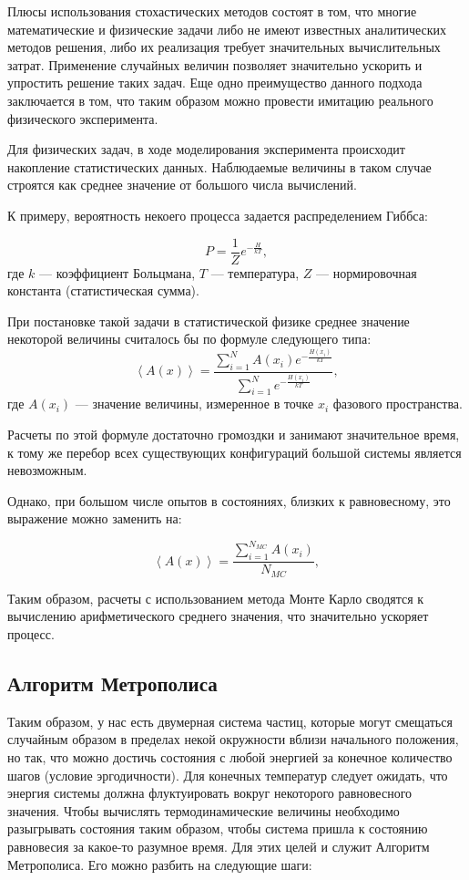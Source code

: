 \documentclass[14pt,a4paper,report]{ncc}
\begin{document}
Плюсы использования стохастических методов состоят в том, что многие математические и физические задачи либо не имеют известных аналитических методов решения, либо их реализация требует значительных вычислительных затрат. Применение случайных величин позволяет значительно ускорить и упростить решение таких задач. Еще одно преимущество данного подхода заключается в том, что таким образом можно провести имитацию реального физического эксперимента.

Для физических задач, в ходе моделирования эксперимента происходит накопление статистических данных. Наблюдаемые величины в таком случае строятся как среднее значение от большого числа вычислений. 

К примеру, вероятность некоего процесса задается распределением Гиббса:

\begin{equation}
P=\frac{1}{Z}e^{-\frac{H}{kT}},  
\end{equation}
где $k$ --- коэффициент Больцмана, $T$ --- температура, $Z$ --- нормировочная константа (статистическая сумма). 

При постановке такой задачи в статистической физике среднее значение некоторой величины считалось бы по формуле следующего типа:
\begin{equation}
\left\langle A(x)\right\rangle=\frac{\sum_{i=1}^NA(x_i)e^{-\frac{H(x_i)}{kT}}}{\sum_{i=1}^Ne^{-\frac{H(x_i)}{kT}}},
\end{equation}
где $A(x_i)$  --- значение величины, измеренное в точке $x_i$ фазового пространства.

Расчеты по этой формуле достаточно громоздки и занимают значительное время, к тому же перебор всех существующих конфигураций большой системы является невозможным.

Однако, при большом числе опытов в состояниях, близких к равновесному, это выражение можно заменить на:

\begin{equation}
\left\langle A(x)\right\rangle=\frac{\sum_{i=1}^{N_{MC}}A(x_i)}{N_{MC}},
\end{equation}

Таким образом, расчеты с использованием метода Монте Карло сводятся к вычислению арифметического среднего значения, что значительно ускоряет процесс.

\subsection{Алгоритм Метрополиса}
Таким образом, у нас есть двумерная система частиц, которые могут смещаться случайным образом в пределах некой окружности вблизи начального положения, но так, что можно достичь состояния с любой энергией за конечное количество шагов (условие эргодичности). Для конечных температур следует ожидать, что энергия системы должна флуктуировать вокруг некоторого равновесного значения. Чтобы вычислять термодинамические величины необходимо разыгрывать состояния таким образом, чтобы система пришла к состоянию равновесия за какое-то разумное время. Для этих целей и служит Алгоритм Метрополиса. Его можно разбить на следующие шаги:
\end{document}
